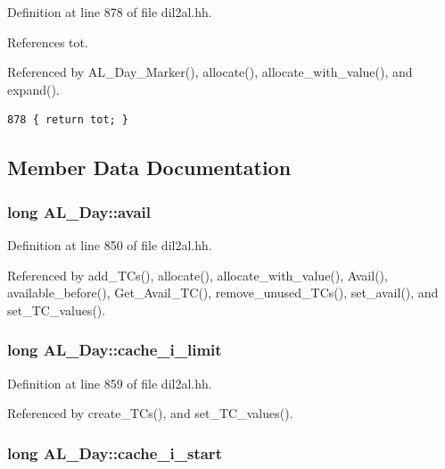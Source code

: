 Definition at line 878 of file dil2al.hh.

References tot.

Referenced by AL\_\-Day\_\-Marker(), allocate(), allocate\_\-with\_\-value(), and expand().



\footnotesize\begin{verbatim}878 { return tot; }
\end{verbatim}\normalsize 


\subsection{Member Data Documentation}
\subsubsection{\setlength{\rightskip}{0pt plus 5cm}long AL\_\-Day::avail\hspace{0.3cm}{\tt  [protected]}}\label{classAL__Day_n1}




Definition at line 850 of file dil2al.hh.

Referenced by add\_\-TCs(), allocate(), allocate\_\-with\_\-value(), Avail(), available\_\-before(), Get\_\-Avail\_\-TC(), remove\_\-unused\_\-TCs(), set\_\-avail(), and set\_\-TC\_\-values().
\subsubsection{\setlength{\rightskip}{0pt plus 5cm}long AL\_\-Day::cache\_\-i\_\-limit\hspace{0.3cm}{\tt  [protected]}}\label{classAL__Day_n10}




Definition at line 859 of file dil2al.hh.

Referenced by create\_\-TCs(), and set\_\-TC\_\-values().
\subsubsection{\setlength{\rightskip}{0pt plus 5cm}long AL\_\-Day::cache\_\-i\_\-start\hspace{0.3cm}{\tt  [protected]}}\label{classAL__Day_n9}




